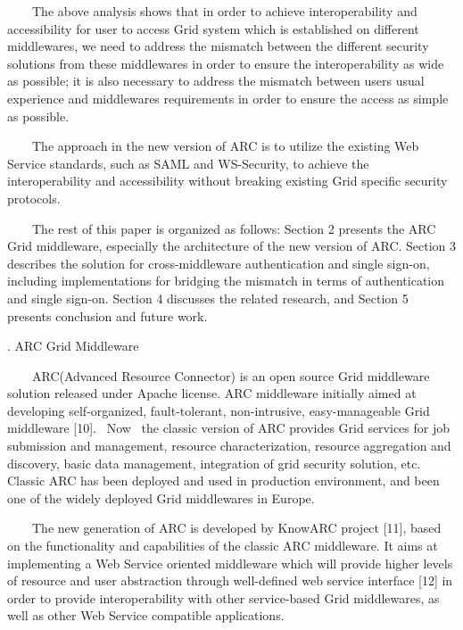 \documentclass{article}
\begin{document}
\ \ \ \ The above analysis shows that in order to achieve
interoperability and accessibility for user to access Grid system which
is established on different middlewares, we need to address the
mismatch between the different security solutions from these
middlewares in order to ensure the interoperability as wide as
possible; it is also necessary to address the mismatch between
users{\textquotesingle} usual experience and
middleware{\textquotesingle}s requirements in order to ensure the
access as simple as possible.

\ \ \ \ The approach in the new version of ARC is to utilize the
existing Web Service standards, such as SAML and WS-Security, to
achieve the interoperability and accessibility without breaking
existing Grid specific security protocols.

\ \ \ \ The rest of this paper is organized as follows: Section 2
presents the ARC Grid middleware, especially the architecture of the
new version of ARC. Section 3 describes the solution for
cross-middleware authentication and single sign-on, including
implementations for bridging the mismatch in terms of authentication
and single sign-on. Section 4 discusses the related research, and
Section 5 presents conclusion and future work.


\bigskip

{. ARC Grid Middleware 
\par}

\ \ \ \ ARC(Advanced Resource Connector) is an open source Grid
middleware solution released under Apache license. ARC middleware
initially aimed at developing self-organized, fault-tolerant,
non-intrusive, easy-manageable Grid middleware [10]. \ Now \ the
classic version of ARC provides Grid services for job submission and
management, resource characterization, resource aggregation and
discovery, basic data management, integration of grid security
solution, etc. Classic ARC has been deployed and used in production
environment, and been one of the widely deployed Grid middlewares in
Europe.

\ \ \ \ The new generation of ARC is developed by KnowARC project [11],
based on the functionality and capabilities of the classic ARC
middleware. It aims at implementing a Web Service oriented middleware
which will provide higher levels of resource and user abstraction
through well-defined web service interface [12] in order to provide
interoperability with other service-based Grid middlewares, as well as
other Web Service compatible applications.
\end{document}
